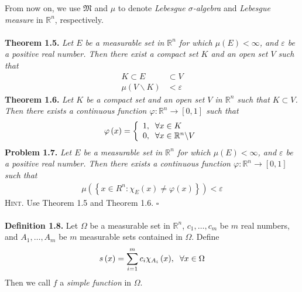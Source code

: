 \documentclass[a4paper]{article}
\numberwithin{equation}{section}
\begin{document}
From now on, we use $\mathfrak{M}$ and $\mu$ to denote \textit{Lebesgue $\sigma$-algebra} and \textit{Lebesgue measure} in $\mathbb{R}^n$, respectively.\\
\\
\textbf{Theorem 1.5.} \textit{Let $E$ be a measurable set in $\mathbb{R}^n$ for which $\mu \left(E\right) <\infty$, and $\varepsilon$ be a positive real number. Then there exist a compact set $K$ and an open set $V$ such that}
\begin{align}
K \subset E &\subset V\\
\mu \left( {V\backslash K} \right) &< \varepsilon 
\end{align}
\textbf{Theorem 1.6.} \textit{Let $K$ be a compact set and an open set $V$ in $\mathbb{R}^n$ such that $K\subset V$. Then there exists a continuous function $\varphi :{\mathbb{R}^n} \to \left[ {0,1} \right]$ such that}
\begin{align}
\varphi \left( x \right) = \left\{ {\begin{array}{*{20}{l}}
{1,\hspace{0.2cm}\forall x \in K}\\
{0,\hspace{0.2cm}\forall x \in {\mathbb{R}^n}\backslash V}
\end{array}} \right.
\end{align}
\textbf{Problem 1.7.} \textit{Let $E$ be a measurable set in $\mathbb{R}^n$ for which $\mu \left(E\right) <\infty$, and $\varepsilon$ be a positive real number. Then there exists a continuous function $\varphi :\mathbb{R}^n \to \left[0,1\right]$ such that}
\begin{align}
\mu \left( {\left\{ {x \in {R^n}:{\chi _E}\left( x \right) \ne \varphi \left( x \right)} \right\}} \right) < \varepsilon 
\end{align}
\textsc{Hint.} Use Theorem 1.5 and Theorem 1.6. \hfill $\square$\\
\\
\textbf{Definition 1.8.} Let $\Omega$ be a measurable set in $\mathbb{R}^n$, ${c_1}, \ldots ,{c_m}$ be $m$ real numbers, and ${A_1}, \ldots ,{A_m}$ be $m$ measurable sets contained in $\Omega$. Define
\begin{align}
s\left( x \right) = \sum\limits_{i = 1}^m {{c_i}{\chi _{{A_i}}}\left( x \right)} ,\hspace{0.2cm}\forall x \in \Omega 
\end{align}
Then we call $f$ a \textit{simple function} in $\Omega$.\\
\\
\end{document}
